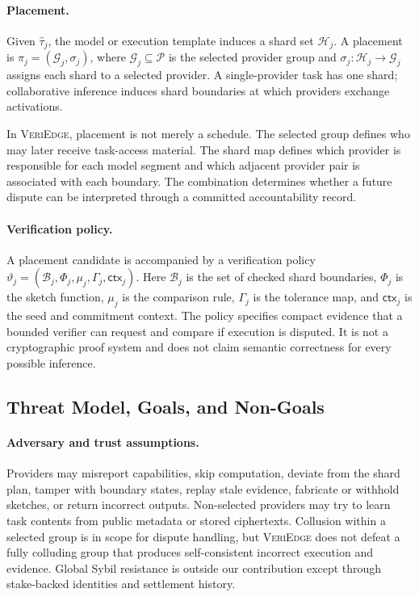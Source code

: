 \documentclass[sigplan,screen,review,anonymous]{acmart}
\newcommand{\system}{\textsc{VeriEdge}\xspace}
\begin{document}
\paragraph{Placement.}
Given \(\widehat{\tau}_j\), the model or execution template induces a shard
set \(\mathcal{H}_j\). A placement is
\(\pi_j=(\mathcal{G}_j,\sigma_j)\), where
\(\mathcal{G}_j\subseteq\mathcal{P}\) is the selected provider group and
\(\sigma_j:\mathcal{H}_j\rightarrow\mathcal{G}_j\) assigns each shard to a
selected provider. A single-provider task has one shard; collaborative
inference induces shard boundaries at which providers exchange activations.

In \system, placement is not merely a schedule. The selected group defines
who may later receive task-access material. The shard map defines which
provider is responsible for each model segment and which adjacent provider
pair is associated with each boundary. The combination determines whether a
future dispute can be interpreted through a committed accountability record.

\paragraph{Verification policy.}
A placement candidate is accompanied by a verification policy
\(\vartheta_j=(\mathcal{B}_j,\Phi_j,\mu_j,\Gamma_j,\mathsf{ctx}_j)\). Here
\(\mathcal{B}_j\) is the set of checked shard boundaries,
\(\Phi_j\) is the sketch function, \(\mu_j\) is the comparison rule,
\(\Gamma_j\) is the tolerance map, and \(\mathsf{ctx}_j\) is the seed and
commitment context. The policy specifies compact evidence that a bounded
verifier can request and compare if execution is disputed. It is not a
cryptographic proof system and does not claim semantic correctness for every
possible inference.

\subsection{Threat Model, Goals, and Non-Goals}
\label{subsec:threat}

\paragraph{Adversary and trust assumptions.}
Providers may misreport capabilities, skip computation, deviate from the
shard plan, tamper with boundary states, replay stale evidence, fabricate or
withhold sketches, or return incorrect outputs. Non-selected providers may
try to learn task contents from public metadata or stored ciphertexts.
Collusion within a selected group is in scope for dispute handling, but
\system does not defeat a fully colluding group that produces
self-consistent incorrect execution and evidence. Global Sybil resistance is
outside our contribution except through stake-backed identities and
settlement history.
\end{document}
